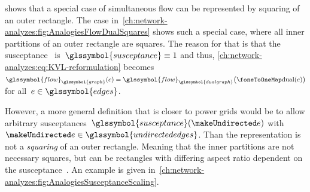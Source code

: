 \citeauthor{Fel13} shows that a special case of simultaneous flow can be
represented by squaring of an outer rectangle. The case
in~\cref{ch:network-analyzes:fig:AnalogiesFlowDualSquares} shows such
a special case, where all inner partitions of an outer rectangle are squares.
The reason for that is that the susceptance~ is~$
\glssymbol{susceptance}\equiv 1$ and thus,
\cref{ch:network-analyzes:eq:KVL-reformulation} becomes~$
% 
\glssymbol{flow}_{\glssymbol{graph}}(\edge) 
=
\glssymbol{flow}_{\glssymbol{dualgraph}}
\big(\oneToOneMap(\edge)\big)
% 
$ for all~$\edge\in\glssymbol{edges}$. 

However, a more general definition that is closer to power grids would be to
allow arbitrary susceptances~$\glssymbol{susceptance}(\undirectededge)$
with~$\undirectededge\in\glssymbol{undirectededges}$. Than the representation is
not a \emph{squaring} of an outer rectangle. Meaning that the inner partitions
are not necessary squares, but can be rectangles with differing aspect ratio
dependent on the susceptance~. An example is given
in~\cref{ch:network-analyzes:fig:AnalogiesSusceptanceScaling}.

